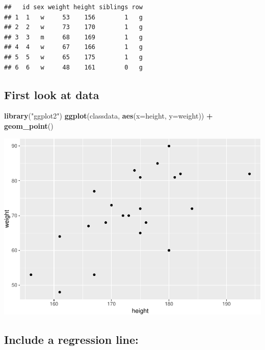 \documentclass[
  doc]{apa6}
\newenvironment{Shaded}{\begin{snugshade}}{\end{snugshade}}
\newcommand{\AttributeTok}[1]{\textcolor[rgb]{0.13,0.29,0.53}{#1}}
\newcommand{\FunctionTok}[1]{\textcolor[rgb]{0.13,0.29,0.53}{\textbf{#1}}}
\newcommand{\NormalTok}[1]{#1}
\newcommand{\SpecialCharTok}[1]{\textcolor[rgb]{0.81,0.36,0.00}{\textbf{#1}}}
\newcommand{\StringTok}[1]{\textcolor[rgb]{0.31,0.60,0.02}{#1}}
\begin{document}
\begin{verbatim}
##   id sex weight height siblings row
## 1  1   w     53    156        1   g
## 2  2   w     73    170        1   g
## 3  3   m     68    169        1   g
## 4  4   w     67    166        1   g
## 5  5   w     65    175        1   g
## 6  6   w     48    161        0   g
\end{verbatim}

\newpage

\hypertarget{first-look-at-data}{%
\subsection{First look at data}\label{first-look-at-data}}

\begin{Shaded}
\begin{Highlighting}[]
\FunctionTok{library}\NormalTok{(}\StringTok{"ggplot2"}\NormalTok{)}
\FunctionTok{ggplot}\NormalTok{(classdata, }\FunctionTok{aes}\NormalTok{(}\AttributeTok{x=}\NormalTok{height, }\AttributeTok{y=}\NormalTok{weight)) }\SpecialCharTok{+} \FunctionTok{geom\_point}\NormalTok{() }
\end{Highlighting}
\end{Shaded}

\includegraphics{rmd_reg_files/figure-latex/pressure-1.pdf}

\newpage

\hypertarget{include-a-regression-line}{%
\subsection{Include a regression line:}\label{include-a-regression-line}}
\end{document}
